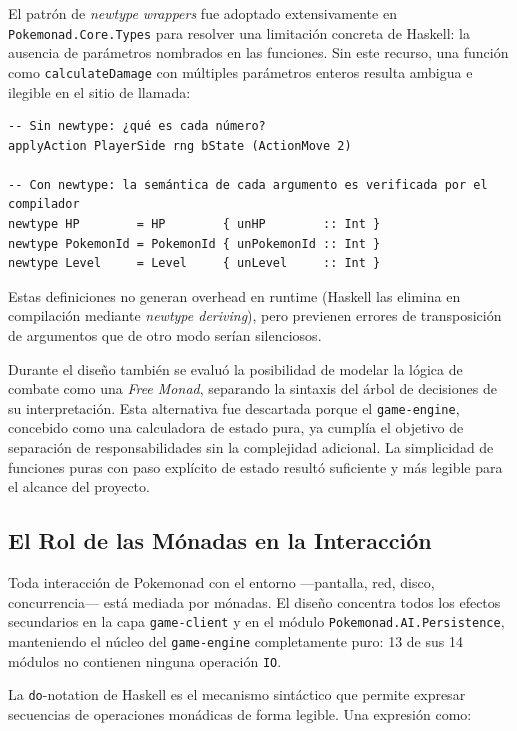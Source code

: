 El patrón de \textit{newtype wrappers} fue adoptado extensivamente en \texttt{Pokemonad.Core.Types} para resolver una limitación concreta de Haskell: la ausencia de parámetros nombrados en las funciones. Sin este recurso, una función como \texttt{calculateDamage} con múltiples parámetros enteros resulta ambigua e ilegible en el sitio de llamada:

\begin{verbatim}
-- Sin newtype: ¿qué es cada número?
applyAction PlayerSide rng bState (ActionMove 2)

-- Con newtype: la semántica de cada argumento es verificada por el compilador
newtype HP        = HP        { unHP        :: Int }
newtype PokemonId = PokemonId { unPokemonId :: Int }
newtype Level     = Level     { unLevel     :: Int }
\end{verbatim}

Estas definiciones no generan overhead en runtime (Haskell las elimina en compilación mediante \textit{newtype deriving}), pero previenen errores de transposición de argumentos que de otro modo serían silenciosos.

\medskip

Durante el diseño también se evaluó la posibilidad de modelar la lógica de combate como una \textit{Free Monad}, separando la sintaxis del árbol de decisiones de su interpretación. Esta alternativa fue descartada porque el \texttt{game-engine}, concebido como una calculadora de estado pura, ya cumplía el objetivo de separación de responsabilidades sin la complejidad adicional. La simplicidad de funciones puras con paso explícito de estado resultó suficiente y más legible para el alcance del proyecto.

\subsection{El Rol de las Mónadas en la Interacción}

Toda interacción de Pokemonad con el entorno —pantalla, red, disco, concurrencia— está mediada por mónadas. El diseño concentra todos los efectos secundarios en la capa \texttt{game-client} y en el módulo \texttt{Pokemonad.AI.Persistence}, manteniendo el núcleo del \texttt{game-engine} completamente puro: 13 de sus 14 módulos no contienen ninguna operación \texttt{IO}.

La \texttt{do}-notation de Haskell es el mecanismo sintáctico que permite expresar secuencias de operaciones monádicas de forma legible. Una expresión como:

